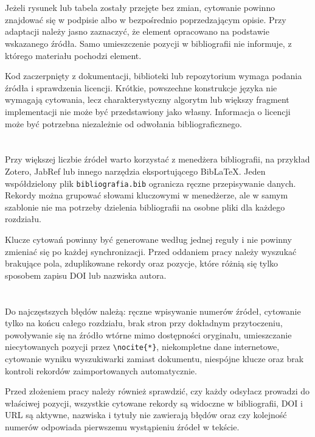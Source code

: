 \section{}

Jeżeli rysunek lub tabela zostały przejęte bez zmian, cytowanie powinno znajdować się w podpisie albo w bezpośrednio poprzedzającym opisie. Przy adaptacji należy jasno zaznaczyć, że element opracowano na podstawie wskazanego źródła. Samo umieszczenie pozycji w bibliografii nie informuje, z którego materiału pochodzi element.

Kod zaczerpnięty z dokumentacji, biblioteki lub repozytorium wymaga podania źródła i sprawdzenia licencji. Krótkie, powszechne konstrukcje języka nie wymagają cytowania, lecz charakterystyczny algorytm lub większy fragment implementacji nie może być przedstawiony jako własny. Informacja o licencji może być potrzebna niezależnie od odwołania bibliograficznego.

\section{}

Przy większej liczbie źródeł warto korzystać z menedżera bibliografii, na przykład Zotero, JabRef lub innego narzędzia eksportującego BibLaTeX. Jeden współdzielony plik \texttt{bibliografia.bib} ogranicza ręczne przepisywanie danych. Rekordy można grupować słowami kluczowymi w menedżerze, ale w samym szablonie nie ma potrzeby dzielenia bibliografii na osobne pliki dla każdego rozdziału.

Klucze cytowań powinny być generowane według jednej reguły i nie powinny zmieniać się po każdej synchronizacji. Przed oddaniem pracy należy wyszukać brakujące pola, zduplikowane rekordy oraz pozycje, które różnią się tylko sposobem zapisu DOI lub nazwiska autora.

\section{}

Do najczęstszych błędów należą: ręczne wpisywanie numerów źródeł, cytowanie tylko na końcu całego rozdziału, brak stron przy dokładnym przytoczeniu, powoływanie się na źródło wtórne mimo dostępności oryginału, umieszczanie niecytowanych pozycji przez \verb|\nocite{*}|, niekompletne dane internetowe, cytowanie wyniku wyszukiwarki zamiast dokumentu, niespójne klucze oraz brak kontroli rekordów zaimportowanych automatycznie.

Przed złożeniem pracy należy również sprawdzić, czy każdy odsyłacz prowadzi do właściwej pozycji, wszystkie cytowane rekordy są widoczne w bibliografii, DOI i URL są aktywne, nazwiska i tytuły nie zawierają błędów oraz czy kolejność numerów odpowiada pierwszemu wystąpieniu źródeł w tekście.
